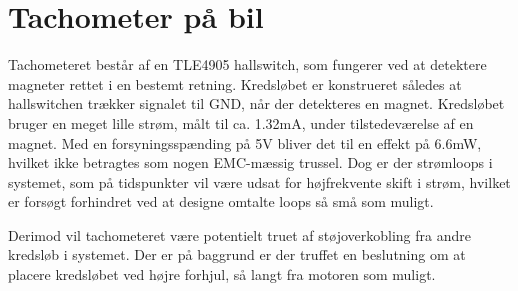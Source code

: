 \section{Tachometer på bil}

Tachometeret består af en TLE4905 %
hallswitch, som fungerer ved at detektere magneter rettet i en bestemt retning. Kredsløbet er konstrueret således at hallswitchen trækker signalet til GND, når der detekteres en magnet. Kredsløbet bruger en meget lille strøm, målt til ca. 1.32mA, under tilstedeværelse af en magnet. Med en forsyningsspænding på 5V bliver det til en effekt på 6.6mW, hvilket ikke betragtes som nogen EMC-mæssig trussel. Dog er der strømloops i systemet, som på tidspunkter vil være udsat for højfrekvente skift i strøm, hvilket er forsøgt forhindret ved at designe omtalte loops så små som muligt. 

Derimod vil tachometeret være potentielt truet af støjoverkobling fra andre kredsløb i systemet. Der er på baggrund er der truffet en beslutning om at placere kredsløbet ved højre forhjul, så langt fra motoren som muligt. 